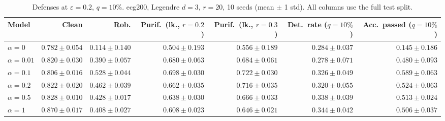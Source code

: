 \begin{table}[htbp]
  \centering
  \small
  \begin{tabular}{@{}lrrrrrr@{}}
    \toprule
    Model & Clean & Rob. & Purif.\ (lk., $r{=}0.2$) & Purif.\ (lk., $r{=}0.3$) & Det.\ rate ($q{=}10\%$) & Acc.\ passed ($q{=}10\%$) \\
    \midrule
    $\alpha{=}0$ & $0.782 \pm 0.054$ & $0.114 \pm 0.140$ & $0.504 \pm 0.193$ & $0.556 \pm 0.189$ & $0.284 \pm 0.037$ & $0.145 \pm 0.186$ \\
    $\alpha{=}0.01$ & $0.820 \pm 0.030$ & $0.390 \pm 0.057$ & $0.680 \pm 0.063$ & $0.684 \pm 0.061$ & $0.278 \pm 0.071$ & $0.480 \pm 0.093$ \\
    $\alpha{=}0.1$ & $0.806 \pm 0.016$ & $\mathbf{0.528 \pm 0.044}$ & $\mathbf{0.698 \pm 0.030}$ & $\mathbf{0.722 \pm 0.030}$ & $0.326 \pm 0.049$ & $\mathbf{0.589 \pm 0.063}$ \\
    $\alpha{=}0.2$ & $0.822 \pm 0.020$ & $0.462 \pm 0.039$ & $0.662 \pm 0.035$ & $0.716 \pm 0.035$ & $0.320 \pm 0.055$ & $0.524 \pm 0.063$ \\
    $\alpha{=}0.5$ & $0.828 \pm 0.010$ & $0.428 \pm 0.017$ & $0.638 \pm 0.030$ & $0.666 \pm 0.033$ & $0.338 \pm 0.039$ & $0.513 \pm 0.024$ \\
    $\alpha{=}1$ & $\mathbf{0.870 \pm 0.017}$ & $0.408 \pm 0.027$ & $0.608 \pm 0.023$ & $0.646 \pm 0.021$ & $\mathbf{0.344 \pm 0.042}$ & $0.506 \pm 0.037$ \\
    \bottomrule
  \end{tabular}
  \caption{Defenses at $\varepsilon=0.2$, $q{=}10\%$. ecg200, Legendre $d{=}3$, $r{=}20$, 10 seeds (mean $\pm$ 1 std). All columns use the full test split.}
  \label{tab:ecg200_models_r20_eps0.2}
\end{table}
